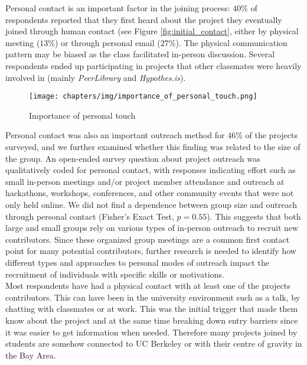 Personal contact is an important factor in the joining process: $40\%$ of respondents reported that they first heard about the project they eventually joined through human contact (see Figure \ref{fig:initial_contact}, either by physical meeting ($13\%$) or through personal email ($27\%$). The physical communication pattern may be biased as the class facilitated in-person discussion. Several respondents ended up participating in projects that other classmates were heavily involved in (mainly {\it PeerLibrary} and {\it Hypothes.is}). 

\begin{figure}[ht!]
\centering
\texttt{[image: chapters/img/importance\_of\_personal\_touch.png]}
\caption{Importance of personal touch}
\label{fig:personal_touch}
\end{figure}

Personal contact was also an important outreach method for 46\% of the projects surveyed, and we further examined whether this finding was related to the size of the group. An open-ended survey question about project outreach was qualitatively coded for personal contact, with responses indicating effort such as small in-person meetings and/or project member attendance and outreach at hackathons, workshops, conferences, and other community events that were not only held online. We did not find a dependence between group size and outreach through personal contact (Fisher's Exact Test, $p = 0.55$). This suggests that both large and small groups rely on various types of in-person outreach to recruit new contributors. Since these organized group meetings are a common first contact point for many potential contributors, further research is needed to identify how different types and approaches to personal modes of outreach impact the recruitment of individuals with specific skills or motivations.\\

\noindent Most respondents have had a physical contact with at least one of the projects contributors. This can have been in the university environment such as a talk, by chatting with classmates or at work. This was the initial trigger that made them know about the project and at the same time breaking down entry barriers since it was easier to get information when needed. Therefore many projects joined by students are somehow connected to UC Berkeley or with their centre of gravity in the Bay Area.